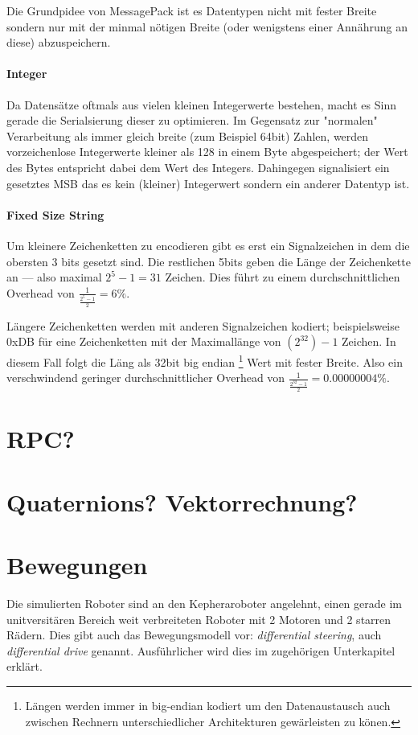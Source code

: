 Die Grundpidee von MessagePack ist es Datentypen nicht mit fester Breite sondern nur mit der minmal n{\"{o}}tigen Breite (oder wenigstens einer Ann{\"{a}}hrung an diese) abzuspeichern.
\paragraph{Integer} Da Datens{\"{a}}tze oftmals aus vielen kleinen Integerwerte bestehen, macht es Sinn gerade die Serialsierung dieser zu optimieren. Im Gegensatz zur "normalen" Verarbeitung als immer gleich breite (zum Beispiel 64bit) Zahlen, werden vorzeichenlose Integerwerte kleiner als 128 in einem Byte abgespeichert; der Wert des Bytes entspricht dabei dem Wert des Integers. Dahingegen signalisiert ein gesetztes MSB das es kein (kleiner) Integerwert sondern ein anderer Datentyp ist.
\paragraph{Fixed Size String} Um kleinere Zeichenketten zu encodieren gibt es erst ein Signalzeichen  in dem die obersten 3 bits gesetzt sind. Die restlichen 5bits geben die L{\"{a}}nge der Zeichenkette an --- also maximal $2^5 - 1 = 31$ Zeichen. Dies f{\"{u}}hrt zu einem durchschnittlichen Overhead von $ \frac{1}{\frac{2^5-1}{2}} = 6\% $.

L{\"{a}}ngere Zeichenketten werden mit anderen Signalzeichen kodiert; beispielsweise 0xDB f{\"{u}}r eine Zeichenketten mit der Maximall{\"{a}}nge von $(2^{32})-1$ Zeichen.
In diesem Fall folgt die L{\"{a}}ng als 32bit big endian
\footnote{L{\"{a}}ngen werden immer in big-endian kodiert um den Datenaustausch auch zwischen Rechnern unterschiedlicher Architekturen gew{\"{a}}rleisten zu k{\"{o}}nen.}
Wert mit fester Breite. Also ein verschwindend geringer durchschnittlicher Overhead von $ \frac{1}{\frac{2^{32}-1}{2}} = 0.00000004\% $.

\clearpage
\section{RPC?}

\clearpage
\section{Quaternions? Vektorrechnung?}

\clearpage
\section{Bewegungen}
Die simulierten Roboter sind an den Kepheraroboter angelehnt, einen gerade im unitversit{\"{a}}ren Bereich weit verbreiteten Roboter mit 2 Motoren und 2 starren R{\"{a}}dern.
Dies gibt auch das Bewegungsmodell vor: \textit{differential steering}, auch \textit{differential drive} genannt. Ausf{\"{u}}hrlicher wird dies im zugeh{\"{o}}rigen Unterkapitel erkl{\"{a}}rt.

